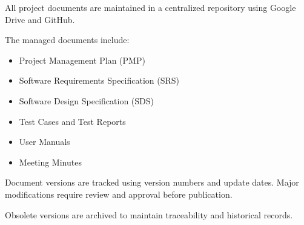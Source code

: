 All project documents are maintained in a centralized repository using Google Drive and GitHub.

The managed documents include:

\begin{itemize}
    \item Project Management Plan (PMP)
    \item Software Requirements Specification (SRS)
    \item Software Design Specification (SDS)
    \item Test Cases and Test Reports
    \item User Manuals
    \item Meeting Minutes
\end{itemize}

Document versions are tracked using version numbers and update dates. Major modifications require review and approval before publication.

Obsolete versions are archived to maintain traceability and historical records.